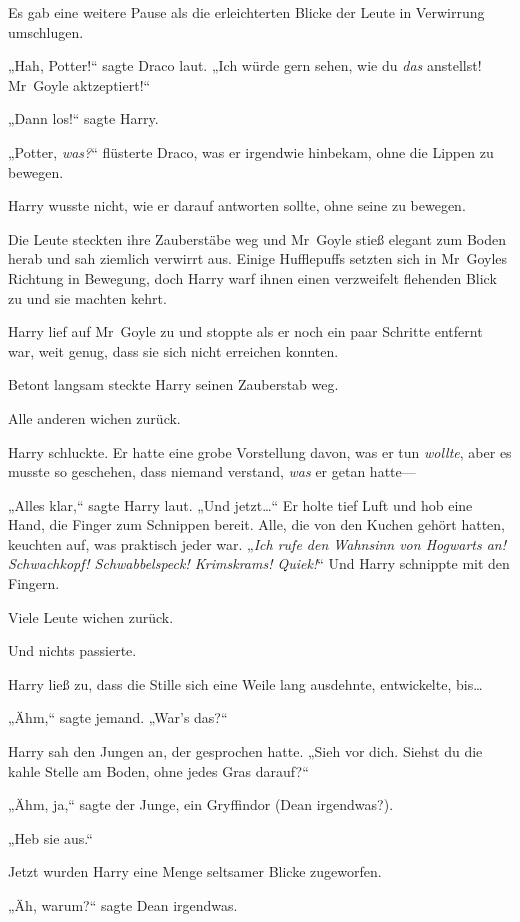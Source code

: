 {Es gab eine weitere Pause als die erleichterten Blicke der Leute in Verwirrung umschlugen.

„Hah, Potter!“ sagte Draco laut. „Ich würde gern sehen, wie du \emph{das} anstellst! Mr~Goyle aktzeptiert!“

„Dann los!“ sagte Harry.

„Potter, \emph{was?}“ flüsterte Draco, was er irgendwie hinbekam, ohne die Lippen zu bewegen.

Harry wusste nicht, wie er darauf antworten sollte, ohne seine zu bewegen.

Die Leute steckten ihre Zauberstäbe weg und Mr~Goyle stieß elegant zum Boden herab und sah ziemlich verwirrt aus. Einige Hufflepuffs setzten sich in Mr~Goyles Richtung in Bewegung, doch Harry warf ihnen einen verzweifelt flehenden Blick zu und sie machten kehrt.

Harry lief auf Mr~Goyle zu und stoppte als er noch ein paar Schritte entfernt war, weit genug, dass sie sich nicht erreichen konnten.

Betont langsam steckte Harry seinen Zauberstab weg.

Alle anderen wichen zurück.

Harry schluckte. Er hatte eine grobe Vorstellung davon, was er tun \emph{wollte}, aber es musste so geschehen, dass niemand verstand, \emph{was} er getan hatte—

„Alles klar,“ sagte Harry laut. „Und jetzt…“ Er holte tief Luft und hob eine Hand, die Finger zum Schnippen bereit. Alle, die von den Kuchen gehört hatten, keuchten auf, was praktisch jeder war. „\emph{Ich rufe den Wahnsinn von Hogwarts an!} \emph{Schwachkopf! Schwabbelspeck! Krimskrams! Quiek!}“ Und Harry schnippte mit den Fingern.

Viele Leute wichen zurück.

Und nichts passierte.

Harry ließ zu, dass die Stille sich eine Weile lang ausdehnte, entwickelte, bis…

„Ähm,“ sagte jemand. „War's das?“

Harry sah den Jungen an, der gesprochen hatte. „Sieh vor dich. Siehst du die kahle Stelle am Boden, ohne jedes Gras darauf?“

„Ähm, ja,“ sagte der Junge, ein Gryffindor (Dean irgendwas?).

„Heb sie aus.“

Jetzt wurden Harry eine Menge seltsamer Blicke zugeworfen.

„Äh, warum?“ sagte Dean irgendwas.

}
